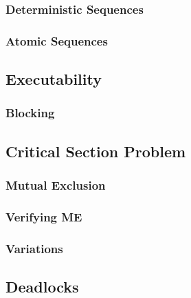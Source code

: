 \documentclass[a4paper, 11pt, accentcolor = tud3b]{tudreport}
\begin{document}
                \subsubsection{Deterministic Sequences} %

                \subsubsection{Atomic Sequences} %

            \subsection{Executability} %

                \subsubsection{Blocking} %

            \subsection{Critical Section Problem} %

                \subsubsection{Mutual Exclusion} %

                \subsubsection{Verifying ME} %

                \subsubsection{Variations} %

            \subsection{Deadlocks} %
\end{document}
